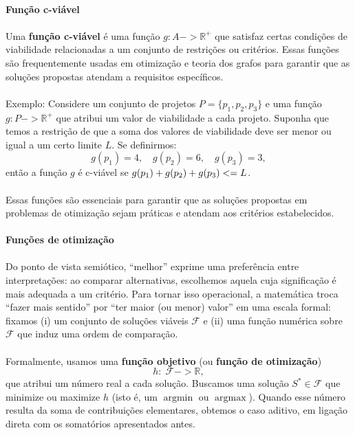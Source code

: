 \documentclass[12pt,a4paper]{article}
\def\emph#1{#1}%
\def\leq{\string<=}%
\def\to{->}%
\begin{document}
\paragraph{Função c-viável}

\paragraph{}Uma \textbf{função c-viável} é uma função \(g: A \to \mathbb{R}^+\) que satisfaz certas condições de viabilidade relacionadas a um conjunto de restrições ou critérios. Essas funções são frequentemente usadas em otimização e teoria dos grafos para garantir que as soluções propostas atendam a requisitos específicos.
\paragraph{}
Exemplo: Considere um conjunto de projetos \(P = \{p_1, p_2, p_3\}\) e uma função \(g: P \to \mathbb{R}^+\) que atribui um valor de viabilidade a cada projeto. Suponha que temos a restrição de que a soma dos valores de viabilidade deve ser menor ou igual a um certo limite \(L\). Se definirmos:
\[g(p_1) = 4, \quad g(p_2) = 6, \quad g(p_3) = 3,\]
então a função \(g\) é c-viável se \(g(p_1) + g(p_2) + g(p_3) \leq L\).
\paragraph{}Essas funções são essenciais para garantir que as soluções propostas em problemas de otimização sejam práticas e atendam aos critérios estabelecidos.

\paragraph{Funções de otimização}

\paragraph{}
Do ponto de vista semiótico, “melhor” exprime uma preferência entre interpretações: ao comparar alternativas, escolhemos aquela cuja significação é mais adequada a um critério. Para tornar isso operacional, a matemática troca “fazer mais sentido” por “ter maior (ou menor) valor” em uma escala formal: fixamos (i) um conjunto de soluções viáveis \(\mathcal{F}\) e (ii) uma função numérica sobre \(\mathcal{F}\) que induz uma ordem de comparação.

\paragraph{}
Formalmente, usamos uma \textbf{função objetivo} (ou \textbf{função de otimização})
\[h:\; \mathcal{F} \to \mathbb{R},\]
que atribui um número real a cada solução. Buscamos uma solução \(S^*\in\mathcal{F}\) que \emph{minimize} ou \emph{maximize} \(h\) (isto é, um \(\operatorname*{argmin}\) ou \(\operatorname*{argmax}\)). Quando esse número resulta da soma de contribuições elementares, obtemos o caso aditivo, em ligação direta com os somatórios apresentados antes.
\end{document}
